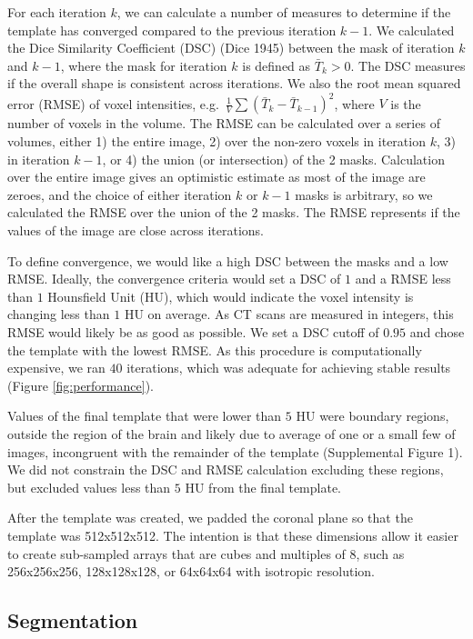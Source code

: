 \documentclass[]{elsarticle} %
\begin{document}
For each iteration \(k\), we can calculate a number of measures to determine if the template has converged compared to the previous iteration \(k - 1\). We calculated the Dice Similarity Coefficient (DSC) (Dice 1945) between the mask of iteration \(k\) and \(k-1\), where the mask for iteration \(k\) is defined as \(\bar{T}_{k} > 0\). The DSC measures if the overall shape is consistent across iterations. We also the root mean squared error (RMSE) of voxel intensities, e.g.~\(\frac{1}{V} \sum\left(\bar{T}_{k} - \bar{T}_{k-1}\right)^2\), where \(V\) is the number of voxels in the volume. The RMSE can be calculated over a series of volumes, either 1) the entire image, 2) over the non-zero voxels in iteration \(k\), 3) in iteration \(k-1\), or 4) the union (or intersection) of the 2 masks. Calculation over the entire image gives an optimistic estimate as most of the image are zeroes, and the choice of either iteration \(k\) or \(k-1\) masks is arbitrary, so we calculated the RMSE over the union of the 2 masks. The RMSE represents if the values of the image are close across iterations.

To define convergence, we would like a high DSC between the masks and a low RMSE. Ideally, the convergence criteria would set a DSC of \(1\) and a RMSE less than \(1\) Hounsfield Unit (HU), which would indicate the voxel intensity is changing less than \(1\) HU on average. As CT scans are measured in integers, this RMSE would likely be as good as possible. We set a DSC cutoff of \(0.95\) and chose the template with the lowest RMSE. As this procedure is computationally expensive, we ran \(40\) iterations, which was adequate for achieving stable results (Figure \ref{fig:performance}).

Values of the final template that were lower than \(5\) HU were boundary regions, outside the region of the brain and likely due to average of one or a small few of images, incongruent with the remainder of the template (Supplemental Figure 1). We did not constrain the DSC and RMSE calculation excluding these regions, but excluded values less than \(5\) HU from the final template.

After the template was created, we padded the coronal plane so that the template was 512x512x512. The intention is that these dimensions allow it easier to create sub-sampled arrays that are cubes and multiples of 8, such as 256x256x256, 128x128x128, or 64x64x64 with isotropic resolution.

\hypertarget{segmentation}{%
\subsection{Segmentation}\label{segmentation}}
\end{document}
